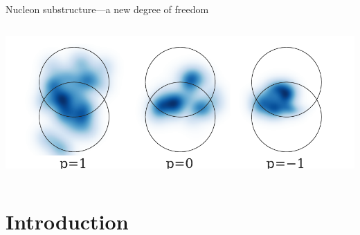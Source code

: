 \documentclass{beamer}
\begin{document}
\begin{frame}[plain]{Nucleon substructure---a new degree of freedom}
\begin{columns}
\begin{column}{.95\textwidth}
\begin{flushleft}
{          \includegraphics[width=.85\columnwidth]{proton_shapes_substructure}
        }
      \end{flushleft}
    \end{column}
  \end{columns}
\end{frame}

\section{Introduction}
\end{document}
